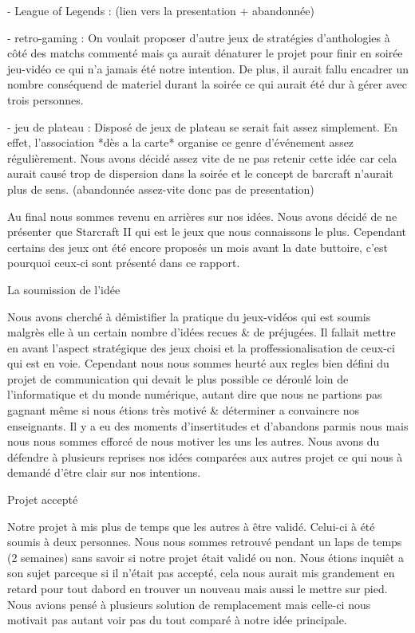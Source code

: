     - League of Legends : (lien vers la presentation + abandonnée)

    - retro-gaming : On voulait proposer d'autre jeux de stratégies
    d'anthologies à côté des matchs commenté mais ça aurait dénaturer le
    projet pour finir en soirée jeu-vidéo ce qui n'a jamais été notre
    intention. De plus, il aurait fallu encadrer un nombre conséquend de
    materiel durant la soirée ce qui aurait été dur à gérer avec trois
    personnes.

    - jeu de plateau : Disposé de jeux de plateau se serait fait assez
    simplement. En effet, l'association *dès a la carte* organise ce genre
    d'événement assez régulièrement. Nous avons décidé assez vite de ne pas
    retenir cette idée car cela aurait causé trop de dispersion dans la
    soirée et le concept de barcraft n'aurait plus de sens.  (abandonnée
    assez-vite donc pas de presentation)

    Au final nous sommes revenu en arrières sur nos idées. Nous avons
    décidé de ne présenter que Starcraft II qui est le jeux que nous
    connaissons le plus. Cependant certains des jeux ont été encore
    proposés un mois avant la date buttoire, c'est pourquoi ceux-ci sont
    présenté dans ce rapport.

  La soumission de l'idée

    Nous avons cherché à démistifier la pratique du jeux-vidéos qui est
    soumis malgrès elle à un certain nombre d'idées recues & de
    préjugées. Il fallait mettre en avant l'aspect stratégique des jeux
    choisi et la proffessionalisation de ceux-ci qui est en
    voie. Cependant nous nous sommes heurté aux regles bien défini du
    projet de communication qui devait le plus possible ce déroulé loin
    de l'informatique et du monde numérique, autant dire que nous ne
    partions pas gagnant même si nous étions très motivé & déterminer a
    convaincre nos enseignants. Il y a eu des moments d'insertitudes et
    d'abandons parmis nous mais nous nous sommes efforcé de nous motiver
    les uns les autres. Nous avons du défendre à plusieurs reprises nos
    idées comparées aux autres projet ce qui nous à demandé d'être clair sur
    nos intentions.

  Projet accepté

    Notre projet à mis plus de temps que les autres à être validé.
    Celui-ci à été soumis à deux personnes. Nous nous sommes retrouvé
    pendant un laps de temps (2 semaines) sans savoir si notre projet était
    validé ou non. Nous étions inquiêt a son sujet parceque si il n'était
    pas accepté, cela nous aurait mis grandement en retard pour tout dabord
    en trouver un nouveau mais aussi le mettre sur pied. Nous avions pensé à
    plusieurs solution de remplacement mais celle-ci nous motivait pas
    autant voir pas du tout comparé à notre idée principale.

